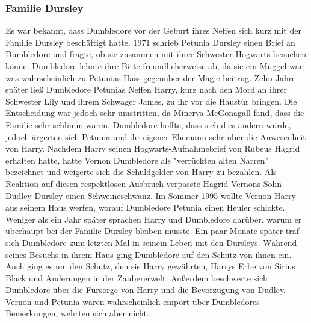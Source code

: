 \documentclass[a4paper, 10pt]{article}
\begin{document}
\subsubsection*{\large Familie Dursley}
Es war bekannt, dass Dumbledore vor der Geburt ihres Neffen sich kurz mit der Familie Dursley beschäftigt hatte. 1971 schrieb Petunia Dursley einen Brief an Dumbledore und fragte, ob sie zusammen mit ihrer Schwester Hogwarts besuchen könne. Dumbledore lehnte ihre Bitte freundlicherweise ab, da sie ein Muggel war, was wahrscheinlich zu Petunias Hass gegenüber der Magie beitrug. Zehn Jahre später ließ Dumbledore Petunias Neffen Harry, kurz nach den Mord an ihrer Schwester Lily und ihrem Schwager James, zu ihr vor die Haustür bringen. Die Entscheidung war jedoch sehr umstritten, da Minerva McGonagall fand, dass die Familie sehr schlimm waren. Dumbledore hoffte, dass sich dies ändern würde, jedoch ärgerten sich Petunia und ihr eigener Ehemann sehr über die Anwesenheit von Harry.
\vspace{10pt}
\newline
{}  
Nachdem Harry seinen Hogwarts-Aufnahmebrief von Rubeus Hagrid erhalten hatte, hatte Vernon Dumbledore als "verrückten alten Narren" bezeichnet und weigerte sich die Schuldgelder von Harry zu bezahlen. Als Reaktion auf diesen respektlosen Ausbruch verpasste Hagrid Vernons Sohn Dudley Dursley einen Schweineschwanz. Im Sommer 1995 wollte Vernon Harry aus seinem Haus werfen, worauf Dumbledore Petunia einen Heuler schickte. Weniger als ein Jahr später sprachen Harry und Dumbledore darüber, warum er überhaupt bei der Familie Dursley bleiben müsste.
\vspace{10pt}
\newline
{}  
Ein paar Monate später traf sich Dumbledore zum letzten Mal in seinem Leben mit den Dursleys. Während seines Besuchs in ihrem Haus ging Dumbledore auf den Schutz von ihnen ein. Auch ging es um den Schutz, den sie Harry gewährten, Harrys Erbe von Sirius Black und Änderungen in der Zaubererwelt. Außerdem beschwerte sich Dumbledore über die Fürsorge von Harry und die Bevorzugung von Dudley. Vernon und Petunia waren wahrscheinlich empört über Dumbledores Bemerkungen, wehrten sich aber nicht.
\end{document}
